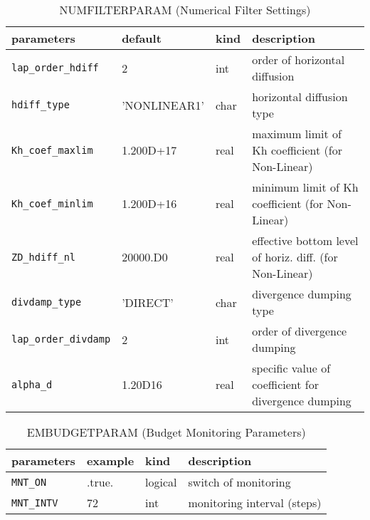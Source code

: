 \begin{table}[htb]
\begin{center}
\caption{NUMFILTERPARAM (Numerical Filter Settings)}
\begin{tabularx}{150mm}{|l|l|l|X|} \hline
 \rowcolor[gray]{0.9} parameters & default & kind & description          \\ \hline
 \verb|lap_order_hdiff| & 2            & int  & order of horizontal diffusion \\ \hline
 \verb|hdiff_type|      & 'NONLINEAR1' & char & horizontal diffusion type \\ \hline
 \verb|Kh_coef_maxlim|  & 1.200D+17    & real & maximum limit of Kh coefficient (for Non-Linear) \\ \hline
 \verb|Kh_coef_minlim|  & 1.200D+16    & real & minimum limit of Kh coefficient (for Non-Linear) \\ \hline
 \verb|ZD_hdiff_nl|     & 20000.D0     & real & effective bottom level of horiz. diff. (for Non-Linear) \\ \hline
 \verb|divdamp_type|    &  'DIRECT'    & char & divergence dumping type \\ \hline
 \verb|lap_order_divdamp| & 2          & int  & order of divergence dumping \\ \hline
 \verb|alpha_d|         & 1.20D16      & real & specific value of coefficient for divergence dumping \\ \hline
\end{tabularx}
\end{center}
\end{table}

\begin{table}[htb]
\begin{center}
\caption{EMBUDGETPARAM (Budget Monitoring Parameters)}
\begin{tabularx}{150mm}{|l|l|l|X|} \hline
 \rowcolor[gray]{0.9} parameters & example & kind & description          \\ \hline
 \verb|MNT_ON|   & .true. & logical & switch of monitoring \\ \hline
 \verb|MNT_INTV| & 72     & int     & monitoring interval (steps) \\ \hline
\end{tabularx}
\end{center}
\end{table}

